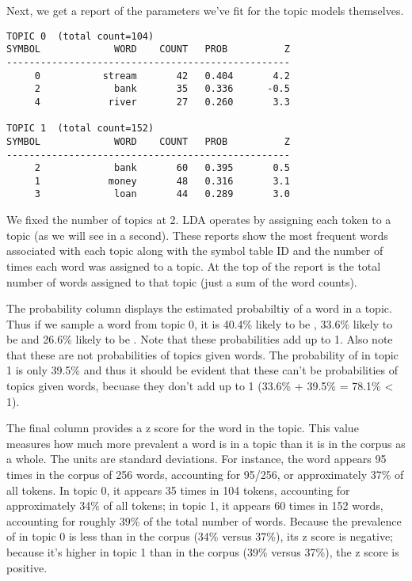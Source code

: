 Next, we get a report of the parameters we've fit for the topic
models themselves.
%
\begin{verbatim}
TOPIC 0  (total count=104)
SYMBOL             WORD    COUNT   PROB          Z
--------------------------------------------------
     0           stream       42   0.404       4.2
     2             bank       35   0.336      -0.5
     4            river       27   0.260       3.3

TOPIC 1  (total count=152)
SYMBOL             WORD    COUNT   PROB          Z
--------------------------------------------------
     2             bank       60   0.395       0.5
     1            money       48   0.316       3.1
     3             loan       44   0.289       3.0
\end{verbatim}
%
We fixed the number of topics at 2.  LDA operates by assigning each
token to a topic (as we will see in a second).  These reports show the
most frequent words associated with each topic along with the symbol
table ID and the number of times each word was assigned to a topic.
At the top of the report is the total number of words assigned to that
topic (just a sum of the word counts).  

The probability column displays the estimated probabiltiy of a word in
a topic.  Thus if we sample a word from topic 0, it is 40.4\% likely
to be , 33.6\% likely to be 
and 26.6\% likely to be .  Note that these
probabilities add up to 1.  Also note that these are not probabilities
of topics given words.  The probability of  in
topic 1 is only 39.5\% and thus it should be evident that these can't
be probabilities of topics given words, becuase they don't add up to 1
(33.6\% + 39.5\% = 78.1\% < 1).

The final column provides a z score for the word in the topic.  This
value measures how much more prevalent a word is in a topic than it is
in the corpus as a whole.  The units are standard deviations.  For
instance, the word  appears 95 times in the corpus
of 256 words, accounting for 95/256, or approximately 37\% of all
tokens.  In topic 0, it appears 35 times in 104 tokens, accounting for
approximately 34\% of all tokens; in topic 1, it appears 60 times in
152 words, accounting for roughly 39\% of the total number of words.
Because the prevalence of  in topic 0 is less than
in the corpus (34\% versus 37\%), its z score is negative; because
it's higher in topic 1 than in the corpus (39\% versus 37\%), the z
score is positive.   

